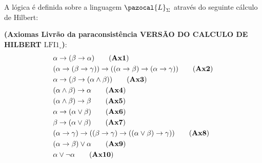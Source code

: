 

    \begin{definicao}[\lfium{}]
        \label{def:lfi1}
        A lógica \lfium{} é definida sobre a linguagem $\pazocal{L}_{\Sigma}$ através do seguinte cálculo de Hilbert:

        \noindent\textbf{(Axiomas Livrão da paraconsistência VERSÃO DO CALCULO DE HILBERT $\text{LFI1}_{\circ}$)}:
        \begin{align*}
            & \alpha \rightarrow (\beta \rightarrow \alpha)\tag{\textbf{Ax1}}                                                                                     \\
            & (\alpha \rightarrow (\beta \rightarrow \gamma)) \rightarrow ((\alpha \rightarrow \beta) \rightarrow (\alpha \rightarrow \gamma ))\tag{\textbf{Ax2}} \\
            & \alpha \rightarrow (\beta \rightarrow (\alpha \land \beta))\tag{\textbf{Ax3}}                                                                       \\
            & (\alpha \land \beta) \rightarrow \alpha\tag{\textbf{Ax4}}                                                                                           \\
            & (\alpha \land \beta) \rightarrow \beta\tag{\textbf{Ax5}}                                                                                            \\
            & \alpha \rightarrow (\alpha \lor \beta)\tag{\textbf{Ax6}}                                                                                            \\
            & \beta \rightarrow (\alpha \lor \beta)\tag{\textbf{Ax7}}                                                                                             \\
            & (\alpha \rightarrow \gamma) \rightarrow ((\beta \rightarrow \gamma) \rightarrow ((\alpha \lor \beta) \rightarrow \gamma))\tag{\textbf{Ax8}}         \\
            & (\alpha \rightarrow \beta) \lor \alpha\tag{\textbf{Ax9}}                                                                                           \\
            & \alpha \lor \neg \alpha\tag{\textbf{Ax10}}                                                                                                          \\

\end{align*}
\end{definicao}
